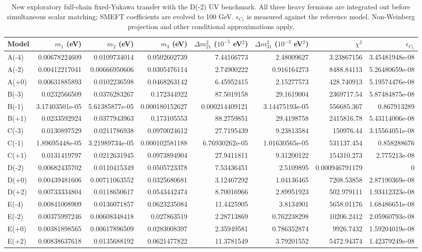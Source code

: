 \begin{table}[htbp]
\centering
\small
\setlength{\tabcolsep}{3.4pt}
\begin{tabular}{lrrrrrrr}
\hline
Model & $m_1$ (eV) & $m_2$ (eV) & $m_3$ (eV) & $\Delta m^2_{21}$ ($10^{-5}$ eV$^2$) & $\Delta m^2_{31}$ ($10^{-3}$ eV$^2$) & $\chi^2$ & $\epsilon_{C_5}$ \\
\hline
A(-4) & 0.00678224609 & 0.0109734014 & 0.0502602739 & 7.44166773 & 2.48009627 & 3.23867156 & 3.45481948e-08 \\
A(-2) & 0.00412217041 & 0.00666950606 & 0.0305476114 & 2.74900222 & 0.916164273 & 8488.84113 & 5.26480659e-08 \\
A(+0) & 0.00631885893 & 0.0102236598 & 0.0468263142 & 6.45952415 & 2.15277573 & 428.740913 & 5.19574476e-08 \\
B(-3) & 0.0232566509 & 0.0376283267 & 0.172344922 & 87.5019158 & 29.1619004 & 2369717.54 & 5.87484875e-08 \\
B(-1) & 3.17403501e-05 & 5.61385877e-05 & 0.000180152627 & 0.000214409121 & 3.14475193e-05 & 556685.367 & 0.867913289 \\
B(+1) & 0.0233592924 & 0.0377943963 & 0.173105553 & 88.2759851 & 29.4198758 & 2415816.78 & 5.43114006e-08 \\
C(-3) & 0.0130897529 & 0.0211786938 & 0.0970024612 & 27.7195439 & 9.23813584 & 150976.44 & 3.15564051e-08 \\
C(-1) & 1.89695448e-05 & 3.21989734e-05 & 0.000102581188 & 6.76930262e-05 & 1.01630565e-05 & 531137.454 & 0.858288676 \\
C(+1) & 0.0131419797 & 0.0212631945 & 0.0973894904 & 27.9411811 & 9.31200122 & 154310.273 & 2.775213e-08 \\
D(-2) & 0.00682435702 & 0.0110415349 & 0.0505723378 & 7.53436451 & 2.5109895 & 0.000946791179 & 0 \\
D(+0) & 0.00439481606 & 0.00711063552 & 0.0325680681 & 3.12467292 & 1.04136465 & 7208.53858 & 2.87190369e-08 \\
D(+2) & 0.00733334804 & 0.0118650617 & 0.0543442474 & 8.70016966 & 2.89951923 & 502.979111 & 1.93412323e-08 \\
E(-4) & 0.00841008909 & 0.0136071857 & 0.0623235084 & 11.4425905 & 3.8134901 & 5658.01176 & 1.68486651e-08 \\
E(-2) & 0.00375997246 & 0.00608348418 & 0.027863519 & 2.28713869 & 0.762238298 & 10206.2412 & 2.05960793e-08 \\
E(+0) & 0.00381898565 & 0.00617896509 & 0.0283008397 & 2.35949581 & 0.786352874 & 9926.7432 & 1.59204019e-08 \\
E(+2) & 0.00838637618 & 0.0135688192 & 0.0621477822 & 11.3781549 & 3.79201552 & 5472.94374 & 1.42379249e-08 \\
\hline
\end{tabular}
\caption{New exploratory full-chain fixed-Yukawa transfer with the D(-2) UV benchmark. All three heavy fermions are integrated out before simultaneous scalar matching; SMEFT coefficients are evolved to 100 GeV. $\epsilon_{C_5}$ is measured against the reference model. Non-Weinberg projection and other conditional approximations apply.}
\label{tab:generalised_b1}
\end{table}
